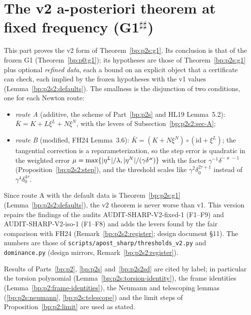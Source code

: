 \section{The v2 a-posteriori theorem at fixed frequency (G1$^{\sharp\sharp}$)}\label{bp:p2s2}

This part proves the v2 form of Theorem~\ref{bp:p2s:g1}. Its conclusion is that of the frozen G1 (Theorem~\ref{bp:p0:g1}); its
hypotheses are those of Theorem~\ref{bp:p2s:g1} plus optional \emph{refined data}, each a bound on an explicit object that a certificate
can check, each implied by the frozen hypotheses with the v1 values (Lemma~\ref{bp:p2s2:defaults}). The smallness is the disjunction
of two conditions, one for each Newton route:
\begin{itemize}
\item \emph{route A} (additive, the scheme of Part~\ref{bp:p2s} and HL19 Lemma~5.2): $\bar K=K+L\xi^L+N\xi^N$, with the levers
  of Subsection~\ref{bp:p2s2:sec-A};
\item \emph{route B} (modified, FH24 Lemma~3.6): $\bar K=(K+N\xi^N)\circ(\mathrm{id}+\xi^L)$; the tangential correction is a
  reparameterization, so the step error is quadratic in the weighted error $\mu=\max\{\lvert \eta^L\rvert/\lambda,\lvert \eta^N\rvert/(\gamma\delta^\varkappa)\}$
  with the factor $\gamma^{-1}\delta^{-\varkappa-1}$ (Proposition~\ref{bp:p2s2:step}), and the threshold scales like
  $\gamma^2\delta_0^{2\tau+1}$ instead of $\gamma^4\delta_0^{4\tau}$.
\end{itemize}
Since route A with the default data is Theorem~\ref{bp:p2s:g1} (Lemma~\ref{bp:p2s2:defaults}), the v2 theorem is never worse than v1.
This version repairs the findings of the audits AUDIT-SHARP-V2-fixed-1 (F1--F9) and AUDIT-SHARP-V2-iso-1 (F1--F8) and adds the
levers found by the fair comparison with FH24 (Remark~\ref{bp:p2s2:register}; design document \S11). The numbers are those of
\texttt{scripts/apost\_sharp/thresholds\_v2.py} and \texttt{dominance.py} (design mirrors, Remark~\ref{bp:p2s2:register}).

Results of Parts~\ref{bp:p2}, \ref{bp:p2s} and~\ref{bp:p2s2sd} are cited by label; in particular the torsion polynomial
(Lemma~\ref{bp:p2s:torsion-identity}), the frame identities (Lemma~\ref{bp:p2:frame-identities}), the Neumann and telescoping lemmas
(\ref{bp:p2s:neumann}, \ref{bp:p2s:telescope}) and the limit steps of Proposition~\ref{bp:p2:limit} are used as stated.

